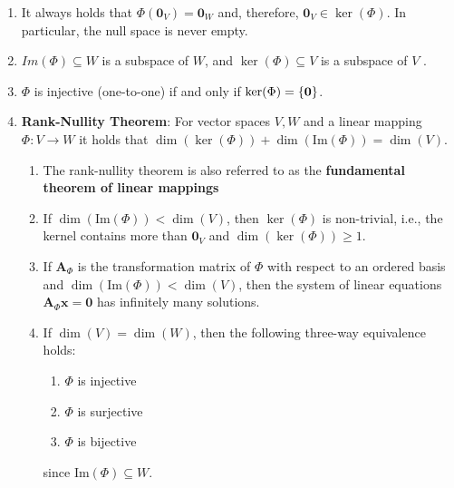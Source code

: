 \begin{enumerate}
    \item It always holds that $\Phi(\bm{0}_V ) = \bm{0}_W$ and, therefore, $\bm{0}_V \in \ker(\Phi)$. 
    In particular, the null space is never empty.
    \hfill \cite{mfml/book/mml/Deisenroth-Faisal-Ong}

    \item $Im(\Phi) \subseteq W$ is a subspace of $W$, and $\ker(\Phi) \subseteq V$ is a subspace of $V$ .
    \hfill \cite{mfml/book/mml/Deisenroth-Faisal-Ong}

    \item $\Phi$ is injective (one-to-one) if and only if $\ker(\Phi) = \left\{\bm{0}\right\}$.
    \hfill \cite{mfml/book/mml/Deisenroth-Faisal-Ong}

    \item \textbf{Rank-Nullity Theorem}: For vector spaces $V, W$ and a linear mapping $\Phi : V \to W$ it holds that $\dim(\ker(\Phi)) + \dim(\text{Im}(\Phi)) = \dim(V )$.
    \hfill \cite{mfml/book/mml/Deisenroth-Faisal-Ong}
    \begin{enumerate}
        \item The rank-nullity theorem is also referred to as the \textbf{fundamental theorem of linear mappings}
        \hfill \cite{mfml/book/mml/Deisenroth-Faisal-Ong}

        \item If $\dim(\text{Im}(\Phi )) < \dim(V )$, then $\ker(\Phi)$ is non-trivial, i.e., the kernel contains more than $\bm{0}_V$ and $\dim(\ker(\Phi)) \geq 1$.
        \hfill \cite{mfml/book/mml/Deisenroth-Faisal-Ong}

        \item If $\bm{A}_\Phi $ is the transformation matrix of $\Phi$  with respect to an ordered basis and $\dim(\text{Im}(\Phi )) < \dim(V )$, then the system of linear equations $\bm{A}_\Phi \bm{x} = \bm{0}$ has infinitely many solutions.
        \hfill \cite{mfml/book/mml/Deisenroth-Faisal-Ong}

        \item If $\dim(V ) = \dim(W)$, then the following three-way equivalence holds:
        \begin{enumerate}
            \item $\Phi$ is injective
            \item $\Phi$ is surjective
            \item $\Phi$ is bijective
        \end{enumerate}
        since $\text{Im}(\Phi) \subseteq W$.
    \end{enumerate}
\end{enumerate}













